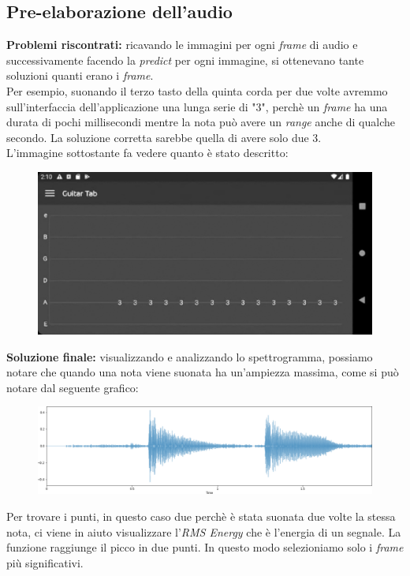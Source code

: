 \subsection{Pre-elaborazione dell'audio}
\textbf{Problemi riscontrati:} ricavando le immagini per ogni \textit{frame} di audio e successivamente facendo la \textit{predict} per ogni immagine, si ottenevano tante soluzioni quanti erano i \textit{frame}.\\ Per esempio, suonando il terzo tasto della quinta corda per due volte avremmo sull'interfaccia dell'applicazione una lunga serie di "3", perchè un \textit{frame} ha una durata di pochi millisecondi mentre la nota può avere un \textit{range} anche di qualche secondo. La soluzione corretta sarebbe quella di avere solo due 3. \\
\newline
L'immagine sottostante fa vedere quanto è stato descritto:
\begin{figure}[H]
	\centering
	\includegraphics[scale=0.28]{./images/img25.png}
\end{figure}
\noindent \textbf{Soluzione finale:} visualizzando e analizzando lo spettrogramma, possiamo notare che quando una nota viene suonata ha un'ampiezza massima, come si può notare dal seguente grafico:
\begin{figure}[H]
	\centering
	\includegraphics[scale=0.35]{./images/img26.png}
\end{figure}
\noindent Per trovare i punti, in questo caso due perchè è stata suonata due volte la stessa nota, ci viene in aiuto visualizzare l'\textit{RMS Energy} che è l'energia di un segnale. La funzione raggiunge il picco in due punti. In questo modo selezioniamo solo i \textit{frame} più significativi.
